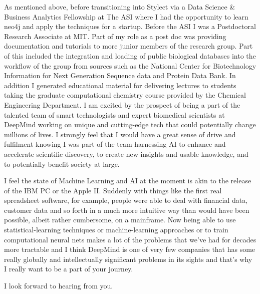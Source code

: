 \documentclass[11pt,a4paper,sans]{moderncv}        %
\begin{document}
As mentioned above, before transitioning into Stylect via a Data Science \& Business Analytics Fellowship at The ASI where I had the opportunity to learn neo4j and apply the techniques for a startup. Before the ASI I was a Postdoctoral Research Associate at MIT. Part of my role as a post doc was providing documentation and tutorials to more junior members of the research group.
Part of this included the integration and loading of public biological databases 
into the workflow of the group from sources such as the National Center for Biotechnology Information for Next Generation Sequence data and Protein Data Bank. In addition I generated educational material for delivering lectures to students taking the graduate computational chemistry course provided by the Chemical Engineering Department.  
%
I am excited by the prospect of being a part of the talented team of smart technologists and expert biomedical scientists at DeepMind
working on unique and cutting-edge tech that could potentially change millions of lives.
%
I strongly feel that I would have a great sense of drive and fulfilment knowing I was 
part of the team
harnessing AI 
to enhance and accelerate scientific discovery, 
to create new insights and usable knowledge, 
and to potentially benefit society at large.


I feel the state of Machine Learning and AI at the 
moment is akin to the release of the IBM PC or the Apple II.
%
Suddenly with things like the first real spreadsheet 
software, for example, people were able to deal with 
financial data, customer data and so forth in a much 
more intuitive way than would have been possible, 
albeit rather cumbersome, on a mainframe. 
%
Now being able to use statistical-learning techniques or machine-learning approaches or to train computational neural nets makes a lot of the problems that we've had for decades more tractable and I think DeepMind is one of very few companies that has some really globally and 
intellectually significant problems in its sights 
and that's why I really want to be a part of 
your journey.
					
I look forward to hearing from you. 

~\\
~\\

\makeletterclosing

%

%

\end{document}
